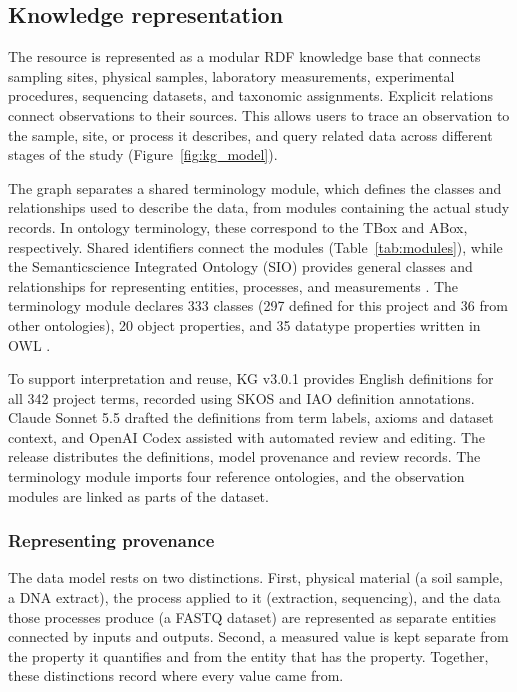 \begin{revision}
\subsection{Knowledge representation}\label{ontology}

The resource is represented as a modular RDF knowledge base that connects sampling sites, physical samples, laboratory measurements, experimental procedures, sequencing datasets, and taxonomic assignments. Explicit relations connect observations to their sources. This allows users to trace an observation to the sample, site, or process it describes, and query related data across different stages of the study (Figure~\ref{fig:kg_model}).



The graph separates a shared terminology module, which defines the classes and relationships used to describe the data, from modules containing the actual study records. In ontology terminology, these correspond to the TBox and ABox, respectively. Shared identifiers connect the modules (Table~\ref{tab:modules}), while the Semanticscience Integrated Ontology (SIO) provides general classes and relationships for representing entities, processes, and measurements \cite{sio}. The terminology module declares 333 classes (297 defined for this project and 36 from other ontologies), 20 object properties, and 35 datatype properties written in OWL \cite{owl2}.

To support interpretation and reuse, KG v3.0.1 provides English
definitions for all 342 project terms, recorded using SKOS and IAO
definition annotations. Claude Sonnet 5.5 drafted the definitions from term labels,
axioms and dataset context, and OpenAI Codex assisted with automated
review and editing. The release distributes the definitions, model provenance
and review records. The terminology module imports
four reference ontologies, and the observation modules are linked as
parts of the dataset.


\subsubsection{Representing provenance}

The data model rests on two distinctions. First, physical material (a soil sample, a DNA extract), the process applied to it (extraction, sequencing), and the data those processes produce (a FASTQ dataset) are represented as separate entities connected by inputs and outputs. Second, a measured value is kept separate from the property it quantifies and from the entity that has the property. Together, these distinctions record where every value came from.


\end{revision}
